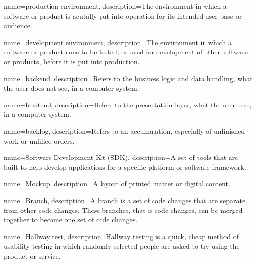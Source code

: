 {
    name=production environment,
    description={The environment in which a software or product is acutally put into operation for its intended user base or audience. }
}

{
    name=development environment,
    description={The environment in which a software or product runs to be tested, or used for development of other software or products, before it is put into production.}
}

{
    name=backend,
    description={Refers to the business logic and data handling, what the user does not see, in a computer system.}
}

{
    name=frontend,
    description={Refers to the presentation layer, what the user sees, in a computer system.}
}

{
    name=backlog,
    description={Refers to an accumulation, especially of unfinished work or unfilled orders.}
}

{
    name=Software Development Kit (SDK),
    description={A set of tools that are built to help develop applications for a specific platform or software framework.}
}

{
    name=Mockup,
    description={A layout of printed matter or digital content.}
}


{
    name=Branch,
    description={A branch is a set of code changes that are separate from other code changes. These branches, that is code changes, can be merged together to become one set of code changes. }
}

{
    name=Hallway test,
    description={Hallway testing is a quick, cheap method of usability testing in which randomly selected people are asked to try using the product or service.}
}

